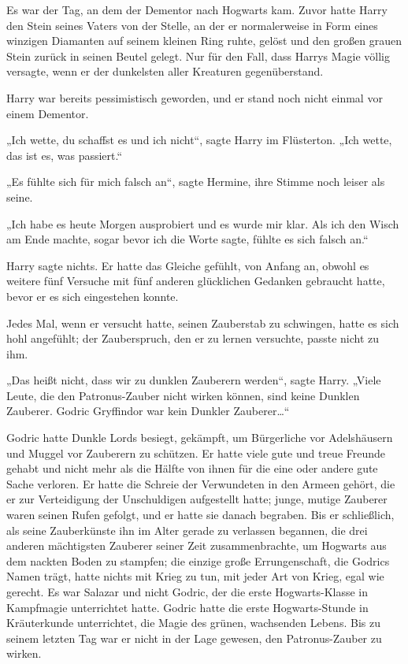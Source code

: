 {Es war der Tag, an dem der Dementor nach Hogwarts kam. Zuvor hatte Harry den Stein seines Vaters von der Stelle, an der er normalerweise in Form eines winzigen Diamanten auf seinem kleinen Ring ruhte, gelöst und den großen grauen Stein zurück in seinen Beutel gelegt. Nur für den Fall, dass Harrys Magie völlig versagte, wenn er der dunkelsten aller Kreaturen gegenüberstand.

Harry war bereits pessimistisch geworden, und er stand noch nicht einmal vor einem Dementor.

„Ich wette, du schaffst es und ich nicht“, sagte Harry im Flüsterton. „Ich wette, das ist es, was passiert.“

„Es fühlte sich für mich falsch an“, sagte Hermine, ihre Stimme noch leiser als seine.

„Ich habe es heute Morgen ausprobiert und es wurde mir klar. Als ich den Wisch am Ende machte, sogar bevor ich die Worte sagte, fühlte es sich falsch an.“

Harry sagte nichts. Er hatte das Gleiche gefühlt, von Anfang an, obwohl es weitere fünf Versuche mit fünf anderen glücklichen Gedanken gebraucht hatte, bevor er es sich eingestehen konnte.

Jedes Mal, wenn er versucht hatte, seinen Zauberstab zu schwingen, hatte es sich hohl angefühlt; der Zauberspruch, den er zu lernen versuchte, passte nicht zu ihm.

„Das heißt nicht, dass wir zu dunklen Zauberern werden“, sagte Harry. „Viele Leute, die den Patronus-Zauber nicht wirken können, sind keine Dunklen Zauberer. Godric Gryffindor war kein Dunkler Zauberer…“

Godric hatte Dunkle Lords besiegt, gekämpft, um Bürgerliche vor Adelshäusern und Muggel vor Zauberern zu schützen. Er hatte viele gute und treue Freunde gehabt und nicht mehr als die Hälfte von ihnen für die eine oder andere gute Sache verloren. Er hatte die Schreie der Verwundeten in den Armeen gehört, die er zur Verteidigung der Unschuldigen aufgestellt hatte; junge, mutige Zauberer waren seinen Rufen gefolgt, und er hatte sie danach begraben. Bis er schließlich, als seine Zauberkünste ihn im Alter gerade zu verlassen begannen, die drei anderen mächtigsten Zauberer seiner Zeit zusammenbrachte, um Hogwarts aus dem nackten Boden zu stampfen; die einzige große Errungenschaft, die Godrics Namen trägt, hatte nichts mit Krieg zu tun, mit jeder Art von Krieg, egal wie gerecht. Es war Salazar und nicht Godric, der die erste Hogwarts-Klasse in Kampfmagie unterrichtet hatte. Godric hatte die erste Hogwarts-Stunde in Kräuterkunde unterrichtet, die Magie des grünen, wachsenden Lebens. Bis zu seinem letzten Tag war er nicht in der Lage gewesen, den Patronus-Zauber zu wirken.

}
